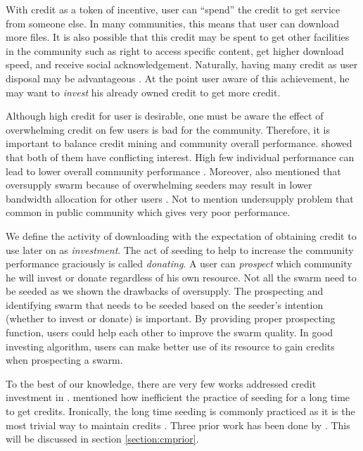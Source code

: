 With credit as a token of incentive, user can ``spend'' the credit to get service from someone else. In many communities, this means that user can download more files. It is also possible that this credit may be spent to get other facilities in the community such as right to access specific content, get higher download speed, and receive social acknowledgement. Naturally, having many credit as user disposal may be advantageous \cite{2014:sustainabilitytorrent:chen}. At the point user aware of this achievement, he may want to \textit{invest} his already owned credit to get more credit.

Although high credit for user is desirable, one must be aware the effect of overwhelming credit on few users is bad for the community. Therefore, it is important to balance credit mining and community overall performance. \citeauthor{2015:sustainabilitypt:vinko} showed that both of them have conflicting interest. High few individual performance can lead to lower overall community performance \cite{2015:sustainabilitypt:vinko}. Moreover, \citeauthor{2013:survivepriv:jia} also mentioned that oversupply swarm because of overwhelming seeders may result in lower bandwidth allocation for other users \cite{2013:survivepriv:jia}. Not to mention undersupply problem that common in public community which gives very poor performance.

We define the activity of downloading with the expectation of obtaining credit to use later on as \textit{investment}. The act of seeding to help to increase the community performance graciously is called \textit{donating}. A user can \textit{prospect} which community he will invest or donate regardless of his own resource. Not all the swarm need to be seeded as we shown the drawbacks of oversupply. The prospecting and identifying swarm that needs to be seeded based on the seeder's intention (whether to invest or donate) is important. By providing proper prospecting function, users could help each other to improve the swarm quality. In good investing algorithm, users can make better use of its resource to gain credits when prospecting a swarm. 

To the best of our knowledge, there are very few works addressed credit investment in \bt. \citeauthor{2013:survivepriv:jia} mentioned how inefficient the practice of seeding for a long time to get credits. Ironically, the long time seeding is commonly practiced as it is the most trivial way to maintain credits \cite{2013:survivepriv:jia}. Three prior work has been done by \citeauthor{2015:creditmining:capota} \cite{2015:creditmining:capota, 2013:investmentcm:capota, 2014:bwmarket:capota}. This will be discussed in section \ref{section:cmprior}. 

